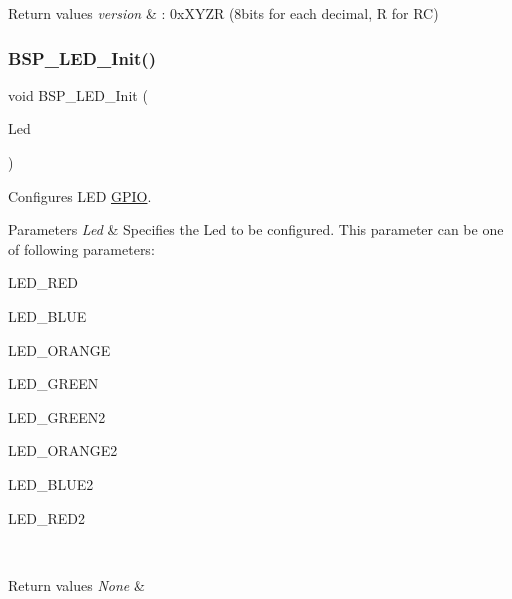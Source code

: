 \begin{DoxyRetVals}{Return values}
{\em version} & \+: 0x\+X\+Y\+ZR (8bits for each decimal, R for RC) \\
\hline
\end{DoxyRetVals}
\mbox{\label{group__STM32F3__DISCOVERY__Exported__Functions_gac1524552e5089ce37457e6df6bac86b6}} 
\subsubsection{\texorpdfstring{B\+S\+P\+\_\+\+L\+E\+D\+\_\+\+Init()}{BSP\_LED\_Init()}}
{\footnotesize\ttfamily void B\+S\+P\+\_\+\+L\+E\+D\+\_\+\+Init (\begin{DoxyParamCaption}\item[{Led\+\_\+\+Type\+Def}]{Led }\end{DoxyParamCaption})}



Configures L\+ED \hyperlink{structGPIO}{G\+P\+IO}. 


\begin{DoxyParams}{Parameters}
{\em Led} & Specifies the Led to be configured. This parameter can be one of following parameters\+: \begin{DoxyItemize}
\item L\+E\+D\+\_\+\+R\+ED \item L\+E\+D\+\_\+\+B\+L\+UE \item L\+E\+D\+\_\+\+O\+R\+A\+N\+GE \item L\+E\+D\+\_\+\+G\+R\+E\+EN \item L\+E\+D\+\_\+\+G\+R\+E\+E\+N2 \item L\+E\+D\+\_\+\+O\+R\+A\+N\+G\+E2 \item L\+E\+D\+\_\+\+B\+L\+U\+E2 \item L\+E\+D\+\_\+\+R\+E\+D2 \end{DoxyItemize}
\\
\hline
\end{DoxyParams}

\begin{DoxyRetVals}{Return values}
{\em None} & \\
\hline
\end{DoxyRetVals}
\mbox{\label{group__STM32F3__DISCOVERY__Exported__Functions_ga939ab765378718b3c299734391cbd4dd}} 
